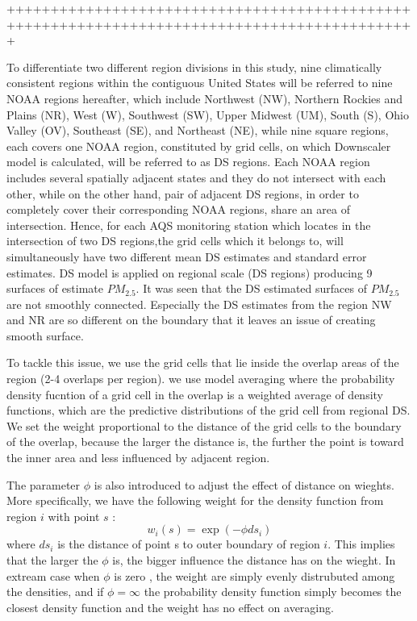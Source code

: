 +++++++++++++++++++++++++++++++++++++++++++++++++++++++++++++++++++++++++++++++++++++++++++++


To differentiate two different region divisions in this study, nine climatically consistent regions within the contiguous United States will be referred to nine NOAA regions hereafter, which include Northwest (NW), Northern Rockies and Plains (NR), West (W), Southwest (SW), Upper Midwest (UM), South (S), Ohio Valley (OV), Southeast (SE), and Northeast (NE), while nine square regions, each covers one NOAA region, constituted by grid cells, on which Downscaler model is calculated, will be referred to as DS regions. Each NOAA region includes several spatially adjacent states and they do not intersect with each other, while on the other hand, pair of adjacent DS regions, in order to completely cover their corresponding NOAA regions, share an area of intersection. Hence, for each AQS monitoring station which locates in the intersection of two DS regions,the grid cells which it belongs to, will simultaneously have two different mean DS estimates and standard error estimates.  DS model is applied on regional scale (DS regions) producing 9 surfaces of estimate $PM_{2.5}$. It was seen that the DS estimated surfaces of $PM_{2.5}$  are not smoothly connected. Especially the DS estimates from the region NW and NR are so different on the boundary that it leaves an issue of creating smooth surface.

To tackle this issue, we use the grid cells that lie inside the overlap areas of the region (2-4 overlaps per region). we use model averaging  where the probability density fucntion of a grid cell in the overlap   is a weighted average of density functions,  which are the predictive distributions of the grid cell from regional DS. We set the weight proportional to the distance of the grid cells to the boundary of the overlap, because the larger the distance is, the further the point is toward the inner area and less influenced by adjacent region.

The parameter $\phi$ is also introduced to adjust the effect of distance on wieghts. More specifically, we have the following weight for the density function from region $i$ with point $s$ :
$$ w_{i}(s)=\exp(-\phi ds_i) $$  where $ds_i $ is the  distance of point s to outer boundary of region $i$. This implies that the larger the $\phi$ is, the bigger influence the distance has on the wieght. In extream case when $\phi$ is zero , the weight are simply evenly distrubuted among the densities, and if $\phi=\infty$  the probability density function simply becomes the closest density function and the weight has no effect on averaging.

